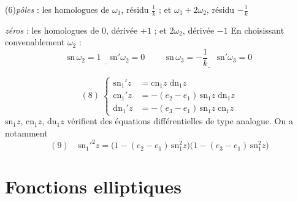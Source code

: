 \documentclass[11pt,a4paper]{article}
\begin{document}
(6)\quad \emph{pôles} : les homologues de $\omega_1$, résidu $\frac{1}{k}$ ;
et $\omega_1+2\omega_2$, résidu $-\frac{1}{k}$

\emph{zéros} : les homologues de $0$, dérivée $+1$ ; et $2\omega_2$,
dérivée $-1$
En choisissant convenablement $\omega_2$ :
\[
\underline{\ \mathrm{sn}\,\omega_2 = 1 \quad \mathrm{sn}'\omega_2 = 0\ } \qquad
\underline{\ \mathrm{sn}\,\omega_3 = -\frac{1}{k} \quad \mathrm{sn}'\omega_3 = 0\ }
\]

\[
(8)\ \left\lbrace
\begin{aligned}
\mathrm{sn}_1'z &= \mathrm{cn}_1 z\;\mathrm{dn}_1 z\\
\mathrm{cn}_1'z &= -(e_2-e_1)\,\mathrm{sn}_1 z\;\mathrm{dn}_1 z\\
\mathrm{dn}_1'z &= -(e_3-e_1)\,\mathrm{sn}_1 z\;\mathrm{cn}_1 z
\end{aligned}
\right.
\]
$\mathrm{sn}_1 z$, $\mathrm{cn}_1 z$, $\mathrm{dn}_1 z$ vérifient des équations
différentielles de type analogue. On a notamment
\[
(9)\quad \mathrm{sn}_1'^2 z = \bigl(1-(e_2-e_1)\,\mathrm{sn}_1^2 z\bigr)
\bigl(1-(e_3-e_1)\,\mathrm{sn}_1^2 z\bigr)
\]

\section*{Fonctions elliptiques}
\end{document}
